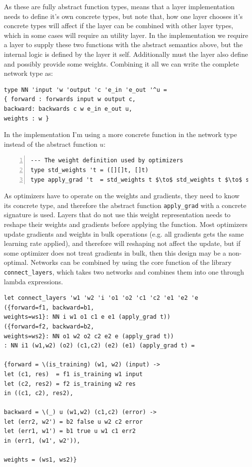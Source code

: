 As these are fully abstract function types,  means that a layer implementation
needs to define it's own concrete types, but note that, how one layer chooses
it's concrete types will affect if the layer can be combined with other layer
types, which in some cases will require an utility layer. 
In the implementation we require a layer to supply  these two functions with the
abstract semantics above, but the internal logic is defined by the layer it
self. 
Additionally must the layer also define and possibly provide some weights. 
Combining it all we can write the complete network type as:
\begin{lstlisting}[language=futhark, caption = {Abstract type for representing a
neural network}]
type NN 'input 'w 'output 'c 'e_in 'e_out '^u =
{ forward : forwards input w output c,
backward: backwards c w e_in e_out u,
weights : w }
\end{lstlisting}
In the implementation I'm using a more concrete function in the network type
instead of the abstract function $u$:
\begin{lstlisting}[language=futhark, numbers = left, caption = {Function
signature for applying gradient}]
--- The weight definition used by optimizers
type std_weights 't = ([][]t, []t)
type apply_grad 't  = std_weights t $\to$ std_weights t $\to$ std_weights t
\end{lstlisting} 
As optimizers have to operate on the weights and gradients, they need to know
its concrete type, and therefore the abstract function \texttt{apply\_grad} with
a concrete signature is used. 
Layers that do not use this weight representation needs to reshape their weights
and gradients before applying the function. 
Most optimizers update gradients and weights in bulk operations (e.g. all
gradients gets the same learning rate applied), and therefore will reshaping not
affect the update, but if some optimizer does not treat gradients in bulk, then
this design may be a non-optimal. \newline   \newline  
Networks can be combined by using the core function of the library
\texttt{connect\_layers}, which takes two networks and combines them into one
through lambda expressions. 
\begin{lstlisting}[language=futhark, caption = {Function for combining two
networks}, label = {connect}]
let connect_layers 'w1 'w2 'i 'o1 'o2 'c1 'c2 'e1 'e2 'e
({forward=f1, backward=b1,
weights=ws1}: NN i w1 o1 c1 e e1 (apply_grad t))
({forward=f2, backward=b2,
weights=ws2}: NN o1 w2 o2 c2 e2 e (apply_grad t))
: NN i1 (w1,w2) (o2) (c1,c2) (e2) (e1) (apply_grad t) =

{forward = \(is_training) (w1, w2) (input) ->
let (c1, res)  = f1 is_training w1 input
let (c2, res2) = f2 is_training w2 res
in ((c1, c2), res2),

backward = \(_) u (w1,w2) (c1,c2) (error) ->
let (err2, w2') = b2 false u w2 c2 error
let (err1, w1') = b1 true u w1 c1 err2
in (err1, (w1', w2')),

weights = (ws1, ws2)}
\end{lstlisting}
